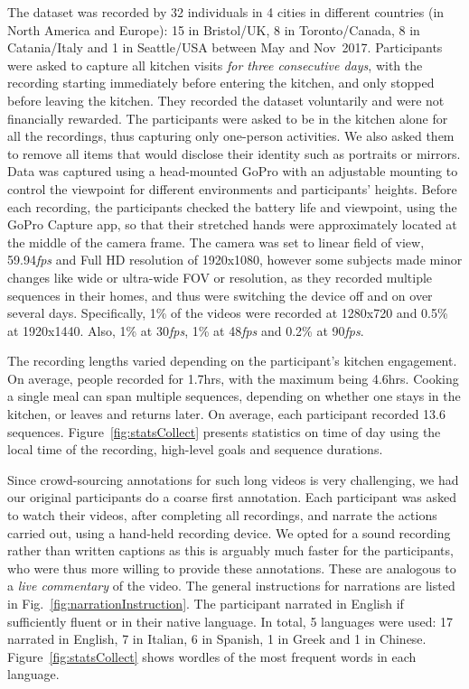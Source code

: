 \documentclass[runningheads]{llncs}
\newcommand{\fps}{\textit{fps}}
\begin{document}
The dataset was recorded by 32 individuals in 4 cities in different countries (in North America and Europe): 15 in Bristol/UK, 
8 in Toronto/Canada, 
8 in Catania/Italy 
and 1 in Seattle/USA
between May and Nov~2017. 
Participants were asked to capture all kitchen visits \textit{for three consecutive days}, with the recording starting immediately before entering the kitchen, and only stopped before leaving the kitchen. They recorded the dataset voluntarily and were not financially rewarded. The participants were asked to be in the kitchen alone for all the recordings, thus capturing only one-person activities. We also asked them to remove all items that would disclose their identity such as portraits or mirrors. 
Data was captured using a head-mounted GoPro with an adjustable mounting to control the viewpoint for different environments and participants' heights. Before each recording, the participants checked the battery life and viewpoint, using the GoPro Capture app, 
so that their stretched hands were approximately located at the middle of the camera frame. The camera was set to linear field of view, 59.94\fps{} and Full HD resolution of 1920x1080, however some subjects made minor changes like wide or ultra-wide FOV or resolution, as they recorded multiple sequences in their homes, and thus were switching the device off and on over several days. Specifically, 1\% of the videos were recorded at 1280x720 and 0.5\% at 1920x1440. Also, 1\% at 30\fps, 1\% at 48\fps{} and 0.2\% at 90\fps.



The recording lengths varied depending on the participant's kitchen engagement.  
On average, people recorded for 1.7hrs, with the maximum being 4.6hrs. Cooking a single meal can span multiple sequences, depending on whether one stays in the kitchen, or leaves and returns later. On average, each participant recorded 13.6 sequences.
Figure~\ref{fig:statsCollect} presents statistics on time of day using the local time of the recording, high-level goals and sequence durations.

Since crowd-sourcing annotations for such long videos is very challenging, we had our original participants do a coarse first annotation. 
Each participant was asked to watch their videos, after completing all recordings, and narrate the actions carried out, using a hand-held recording device. We opted for a sound recording rather than written captions as this is arguably much faster for the participants, who were thus more willing to provide these annotations. These are analogous to a \textit{live commentary} of the video. The general instructions for narrations are listed in Fig.~\ref{fig:narrationInstruction}. The participant narrated in English if sufficiently fluent or in their native language. In total, 5 languages were used: 17 narrated in English, 7 in Italian, 6 in Spanish, 1 in Greek and 1 in Chinese. Figure~\ref{fig:statsCollect} shows wordles of the most frequent words in each language.
\end{document}
